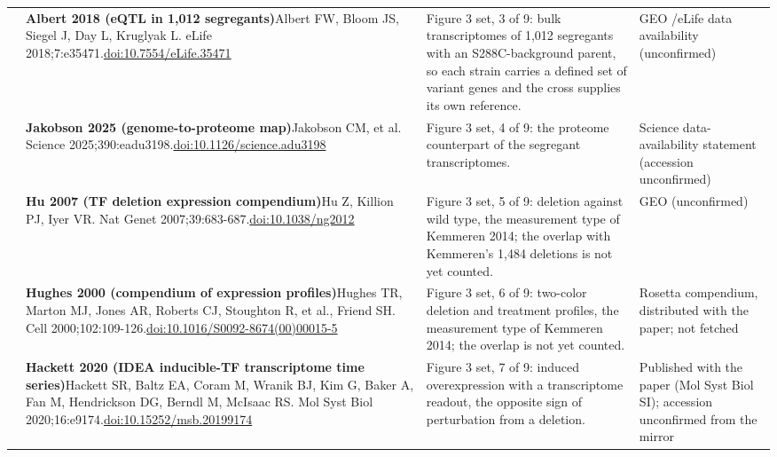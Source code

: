 \begin{landscape}
\begin{longtable}{@{}r@{\hspace{4pt}} L{86mm} L{92mm} L{62mm}@{}}
 & \textbf{Albert 2018 (eQTL in 1,012 segregants)}\newline Albert FW, Bloom JS, Siegel J, Day L, Kruglyak L. eLife 2018;7:e35471.\newline \href{https://doi.org/10.7554/eLife.35471}{doi:10.7554/\allowbreak eLife.35471} & Figure 3 set, 3 of 9: bulk transcriptomes of 1,012 segregants with an S288C-background parent, so each strain carries a defined set of variant genes and the cross supplies its own reference. & GEO /\allowbreak  eLife data availability (unconfirmed) \\
 & \textbf{Jakobson 2025 (genome-to-proteome map)}\newline Jakobson CM, et al. Science 2025;390:eadu3198.\newline \href{https://doi.org/10.1126/science.adu3198}{doi:10.1126/\allowbreak science.adu3198} & Figure 3 set, 4 of 9: the proteome counterpart of the segregant transcriptomes. & Science data-availability statement (accession unconfirmed) \\
 & \textbf{Hu 2007 (TF deletion expression compendium)}\newline Hu Z, Killion PJ, Iyer VR. Nat Genet 2007;39:683-687.\newline \href{https://doi.org/10.1038/ng2012}{doi:10.1038/\allowbreak ng2012} & Figure 3 set, 5 of 9: deletion against wild type, the measurement type of Kemmeren 2014; the overlap with Kemmeren's 1,484 deletions is not yet counted. & GEO (unconfirmed) \\
 & \textbf{Hughes 2000 (compendium of expression profiles)}\newline Hughes TR, Marton MJ, Jones AR, Roberts CJ, Stoughton R, et al., Friend SH. Cell 2000;102:109-126.\newline \href{https://doi.org/10.1016/S0092-8674(00)00015-5}{doi:10.1016/\allowbreak S0092-8674(00)00015-5} & Figure 3 set, 6 of 9: two-color deletion and treatment profiles, the measurement type of Kemmeren 2014; the overlap is not yet counted. & Rosetta compendium, distributed with the paper; not fetched \\
 & \textbf{Hackett 2020 (IDEA inducible-TF transcriptome time series)}\newline Hackett SR, Baltz EA, Coram M, Wranik BJ, Kim G, Baker A, Fan M, Hendrickson DG, Berndl M, McIsaac RS. Mol Syst Biol 2020;16:e9174.\newline \href{https://doi.org/10.15252/msb.20199174}{doi:10.15252/\allowbreak msb.20199174} & Figure 3 set, 7 of 9: induced overexpression with a transcriptome readout, the opposite sign of perturbation from a deletion. & Published with the paper (Mol Syst Biol SI); accession unconfirmed from the mirror \\

\end{longtable}
\end{landscape}
